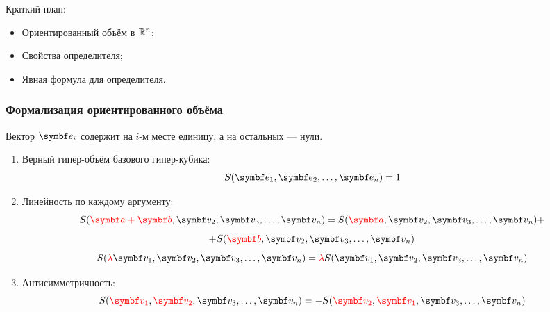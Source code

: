 
\begin{frame} %


\end{frame}



\begin{frame}{Краткий план:}
  \begin{itemize}[<+->]
    \item Ориентированный объём в $\mathbb{R}^n$;
    \item Свойства определителя;
    \item Явная формула для определителя.
  \end{itemize}

\end{frame}




\begin{frame}
    \frametitle{Формализация ориентированного объёма}


    Вектор $\be_i$ содержит на $i$-м месте единицу, а на остальных — нули.
    \pause

    \begin{enumerate}
        \item Верный гипер-объём базового гипер-кубика:
        \[
        S(\be_1, \be_2, \ldots, \be_n) = 1    
        \]
        \pause
        \item Линейность по каждому аргументу:
        \[
            S(\textcolor{red}{\ba + \bb}, \bv_2, \bv_3, \ldots, \bv_n) =  S(\textcolor{red}{\ba}, \bv_2, \bv_3, \ldots, \bv_n) + 
        \]
        \[
            + S(\textcolor{red}{\bb}, \bv_2, \bv_3, \ldots, \bv_n)          
        \]
        \[
            S(\textcolor{red}{\lambda}\bv_1, \bv_2, \bv_3, \ldots, \bv_n) = \textcolor{red}{ \lambda } S(\bv_1, \bv_2, \bv_3, \ldots, \bv_n)
        \]
        \pause
        \item Антисимметричность: 
        \[
          S(\textcolor{red}{\bv_1}, \textcolor{red}{\bv_2}, \bv_3, \ldots, \bv_n) = - S(\textcolor{red}{\bv_2}, \textcolor{red}{\bv_1}, \bv_3, \ldots, \bv_n)  
        \]
    \end{enumerate}
\end{frame}



